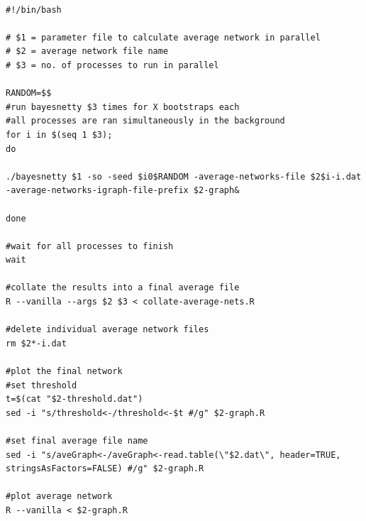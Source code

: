 \documentclass[a4paper,12pt]{article}
\begin{document}
\vspace{0.35cm} \begin{lstlisting}

#!/bin/bash                                                                                                                                          

# $1 = parameter file to calculate average network in parallel                                                                                       
# $2 = average network file name                                                                                                                     
# $3 = no. of processes to run in parallel                                                                                                           

RANDOM=$$
#run bayesnetty $3 times for X bootstraps each                                                                                                       
#all processes are ran simultaneously in the background
for i in $(seq 1 $3);
do

./bayesnetty $1 -so -seed $i0$RANDOM -average-networks-file $2$i-i.dat -average-networks-igraph-file-prefix $2-graph&

done

#wait for all processes to finish                                                                                                                    
wait

#collate the results into a final average file                                                                                                       
R --vanilla --args $2 $3 < collate-average-nets.R

#delete individual average network files                                                                                                             
rm $2*-i.dat

#plot the final network                                                                                                                              
#set threshold                                                                                                                                       
t=$(cat "$2-threshold.dat")
sed -i "s/threshold<-/threshold<-$t #/g" $2-graph.R

#set final average file name                                                                                                                         
sed -i "s/aveGraph<-/aveGraph<-read.table(\"$2.dat\", header=TRUE, stringsAsFactors=FALSE) #/g" $2-graph.R

#plot average network                                                                                                                                
R --vanilla < $2-graph.R

\end{lstlisting} \vspace{0.35cm}
\end{document}
